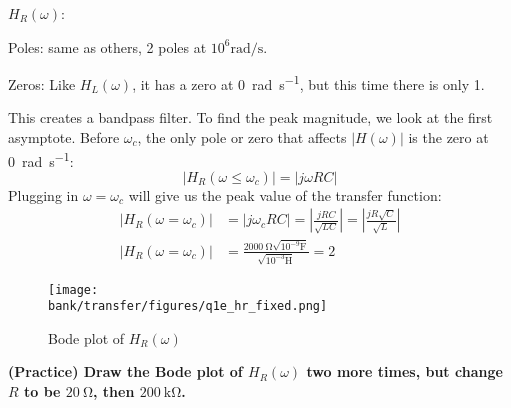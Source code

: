 \begin{enumerate}
{$H_R(\omega)$:

Poles: same as others, 2 poles at $10^6 \si{\radian\per\second}$.

Zeros: Like $H_L(\omega)$, it has a zero at \SI{0}{\radian\per\second}, but this time there is only 1.

This creates a bandpass filter. To find the peak magnitude, we look at the first asymptote. Before $\omega_c$, the only pole or zero that affects $|H(\omega)|$ is the zero at \SI{0}{\radian\per\second}:
\[|H_{R}(\omega \leq \omega_c)|= |j\omega RC|\]
Plugging in $\omega=\omega_c$ will give us the peak value of the transfer function:
\begin{align*}
|H_{R}(\omega = \omega_c)|&= |j\omega_c RC|=\left|\frac{jRC}{\sqrt{LC}}\right| = \left|\frac{jR\sqrt{C}}{\sqrt{L}}\right| \\
 |H_{R}(\omega = \omega_c)|&= \frac{\SI{2000}{\ohm}\sqrt{10^{-9}\si{\farad}}}{\sqrt{10^{-3}\si{\henry}}} = 2
\end{align*}

  \begin{figure}[H]\centering
  \texttt{[image: \\bank/transfer/figures/q1e\_hr\_fixed.png]}
  \caption{Bode plot of $H_R(\omega)$}
  \end{figure}
  
}

\qitem \textbf{(Practice) Draw the Bode plot of $H_R(\omega)$ two more times, but change $R$ to be $\SI{20}{\ohm}$, then $\SI{200}{\kilo\ohm}$.}

\end{enumerate}
